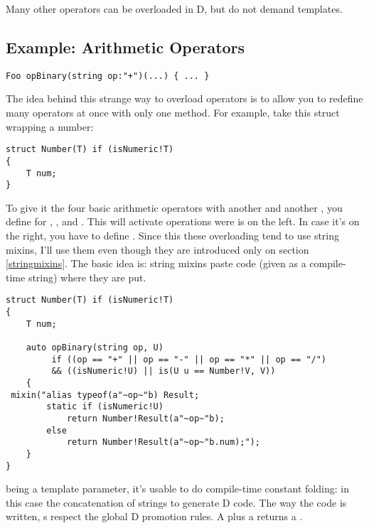 Many other operators can be overloaded in D, but do not demand templates.

\subsection{Example: Arithmetic Operators}


\begin{verbatim}
Foo opBinary(string op:"+")(...) { ... }
\end{verbatim}

The idea behind this strange way to overload operators is to allow you to redefine many operators at once with only one method. For example, take this struct wrapping a number:

\begin{verbatim}
struct Number(T) if (isNumeric!T)
{
    T num;
}
\end{verbatim}

To give it the four basic arithmetic operators with another  and another , you define  for \DD{+}, \DD{-}, \DD{*} and \DD{/}. This will activate operations were  is on the left. In case it's on the right, you have to define . Since this these overloading tend to use string mixins, I'll use them even though they are introduced only on section \ref{stringmixins}. The basic idea is: string mixins paste code (given as a compile-time string) where they are put.

\begin{verbatim}
struct Number(T) if (isNumeric!T)
{
    T num;

    auto opBinary(string op, U) 
         if ((op == "+" || op == "-" || op == "*" || op == "/") 
         && ((isNumeric!U) || is(U u == Number!V, V))
    {
 mixin("alias typeof(a"~op~"b) Result;     
        static if (isNumeric!U)
            return Number!Result(a"~op~"b);
        else
            return Number!Result(a"~op~"b.num);");
    }    
}
\end{verbatim}

 being a template parameter, it's usable to do compile-time constant folding: in this case the concatenation of strings to generate D code. The way the code is written, s respect the global D promotion rules. A  plus a  returns a .

